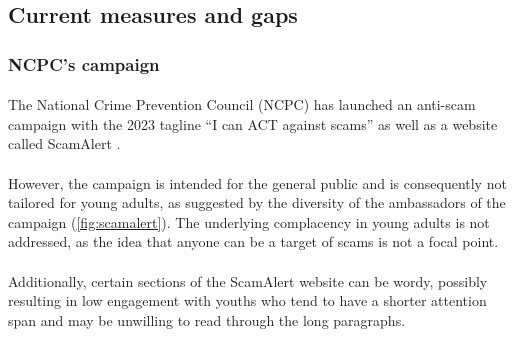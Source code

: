 \documentclass[a4paper]{article}
\begin{document}
\subsection{Current measures and gaps}
\subsubsection{NCPC's campaign}
\paragraph{} The National Crime Prevention Council (NCPC) has launched an
anti-scam campaign with the 2023 tagline ``I can ACT against scams''
\parencite{Sun.2023} as well as a website called ScamAlert \parencite{NCPC}.

\paragraph{} However, the campaign is intended for the general public and is
consequently not tailored for young adults, as suggested by the diversity of the
ambassadors of the campaign (\cref{fig:scamalert}). The underlying complacency
in young adults is not addressed, as the idea that anyone can be a target of
scams is not a focal point.

\paragraph{} Additionally, certain sections of the ScamAlert website can be
wordy, possibly resulting in low engagement with youths who tend to have a
shorter attention span \parencite{ChowHari.2022} and may be unwilling to read
through the long paragraphs.
\end{document}
